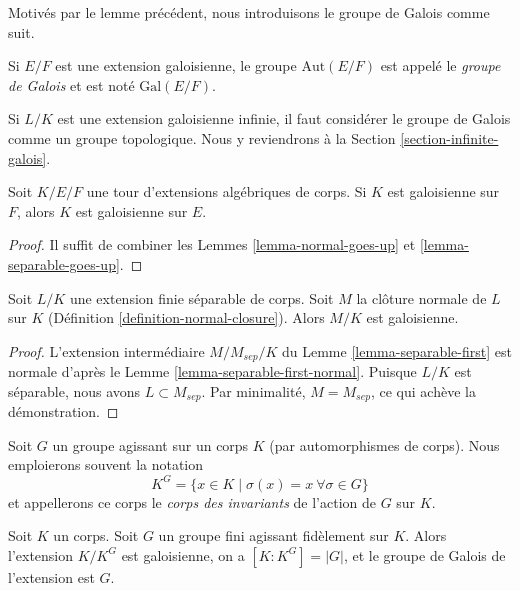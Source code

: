 \noindent
Motivés par le lemme précédent, nous introduisons le groupe de Galois comme suit.

\begin{definition}
\label{definition-galois-group}
Si $E/F$ est une extension galoisienne, le groupe $\text{Aut}(E/F)$ est
appelé le {\it groupe de Galois} et est noté $\text{Gal}(E/F)$.
\end{definition}

\noindent
Si $L/K$ est une extension galoisienne infinie, il faut considérer le
groupe de Galois comme un groupe topologique. Nous y reviendrons à la
Section \ref{section-infinite-galois}.

\begin{lemma}
\label{lemma-galois-goes-up}
Soit $K/E/F$ une tour d'extensions algébriques de corps.
Si $K$ est galoisienne sur $F$, alors $K$ est galoisienne sur $E$.
\end{lemma}

\begin{proof}
Il suffit de combiner les Lemmes \ref{lemma-normal-goes-up} et \ref{lemma-separable-goes-up}.
\end{proof}

\begin{lemma}
\label{lemma-normal-closure-galois}
Soit $L/K$ une extension finie séparable de corps.
Soit $M$ la clôture normale de $L$ sur $K$
(Définition \ref{definition-normal-closure}).
Alors $M/K$ est galoisienne.
\end{lemma}

\begin{proof}
L'extension intermédiaire $M/M_{sep}/K$ du Lemme \ref{lemma-separable-first}
est normale d'après le Lemme \ref{lemma-separable-first-normal}.
Puisque $L/K$ est séparable, nous avons $L \subset M_{sep}$.
Par minimalité, $M = M_{sep}$, ce qui achève la démonstration.
\end{proof}

\noindent
Soit $G$ un groupe agissant sur un corps $K$ (par automorphismes de corps).
Nous emploierons souvent la notation
$$
K^G = \{x \in K \mid \sigma(x) = x \ \forall \sigma \in G\}
$$
et appellerons ce corps le {\it corps des invariants} de l'action de $G$ sur $K$.

\begin{lemma}
\label{lemma-galois-over-fixed-field}
Soit $K$ un corps. Soit $G$ un groupe fini agissant fidèlement sur $K$.
Alors l'extension $K/K^G$ est galoisienne, on a $[K : K^G] = |G|$,
et le groupe de Galois de l'extension est $G$.
\end{lemma}

